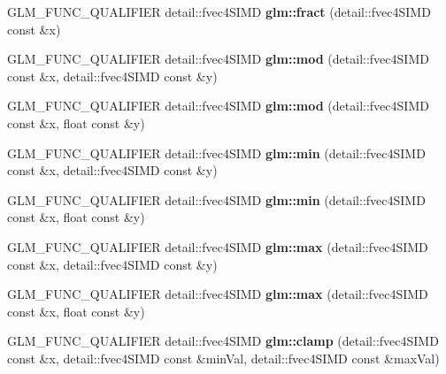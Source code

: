 \begin{DoxyCompactItemize}
\mbox{\label{simd__vec4_8inl_a5a003d7f27903c03744ca6271f1a9051}} 
G\+L\+M\+\_\+\+F\+U\+N\+C\+\_\+\+Q\+U\+A\+L\+I\+F\+I\+ER detail\+::fvec4\+S\+I\+MD {\bfseries glm\+::fract} (detail\+::fvec4\+S\+I\+MD const \&x)
\item 
\mbox{\label{simd__vec4_8inl_a560289b95e600d6da427ad473c1f46cf}} 
G\+L\+M\+\_\+\+F\+U\+N\+C\+\_\+\+Q\+U\+A\+L\+I\+F\+I\+ER detail\+::fvec4\+S\+I\+MD {\bfseries glm\+::mod} (detail\+::fvec4\+S\+I\+MD const \&x, detail\+::fvec4\+S\+I\+MD const \&y)
\item 
\mbox{\label{simd__vec4_8inl_a66a9b0ed141fd219673b9adf8e400ec0}} 
G\+L\+M\+\_\+\+F\+U\+N\+C\+\_\+\+Q\+U\+A\+L\+I\+F\+I\+ER detail\+::fvec4\+S\+I\+MD {\bfseries glm\+::mod} (detail\+::fvec4\+S\+I\+MD const \&x, float const \&y)
\item 
\mbox{\label{simd__vec4_8inl_af6ef9739a4145dc0004408132eff235b}} 
G\+L\+M\+\_\+\+F\+U\+N\+C\+\_\+\+Q\+U\+A\+L\+I\+F\+I\+ER detail\+::fvec4\+S\+I\+MD {\bfseries glm\+::min} (detail\+::fvec4\+S\+I\+MD const \&x, detail\+::fvec4\+S\+I\+MD const \&y)
\item 
\mbox{\label{simd__vec4_8inl_ace53be5aa101f55503d1fd863ac97de3}} 
G\+L\+M\+\_\+\+F\+U\+N\+C\+\_\+\+Q\+U\+A\+L\+I\+F\+I\+ER detail\+::fvec4\+S\+I\+MD {\bfseries glm\+::min} (detail\+::fvec4\+S\+I\+MD const \&x, float const \&y)
\item 
\mbox{\label{simd__vec4_8inl_a8003e838df57188edaa8b8fe512516a6}} 
G\+L\+M\+\_\+\+F\+U\+N\+C\+\_\+\+Q\+U\+A\+L\+I\+F\+I\+ER detail\+::fvec4\+S\+I\+MD {\bfseries glm\+::max} (detail\+::fvec4\+S\+I\+MD const \&x, detail\+::fvec4\+S\+I\+MD const \&y)
\item 
\mbox{\label{simd__vec4_8inl_a6a8611ddc96e204e7669872c6a68b972}} 
G\+L\+M\+\_\+\+F\+U\+N\+C\+\_\+\+Q\+U\+A\+L\+I\+F\+I\+ER detail\+::fvec4\+S\+I\+MD {\bfseries glm\+::max} (detail\+::fvec4\+S\+I\+MD const \&x, float const \&y)
\item 
\mbox{\label{simd__vec4_8inl_a5c4a12e002e5eb23b8a12639c7484378}} 
G\+L\+M\+\_\+\+F\+U\+N\+C\+\_\+\+Q\+U\+A\+L\+I\+F\+I\+ER detail\+::fvec4\+S\+I\+MD {\bfseries glm\+::clamp} (detail\+::fvec4\+S\+I\+MD const \&x, detail\+::fvec4\+S\+I\+MD const \&min\+Val, detail\+::fvec4\+S\+I\+MD const \&max\+Val)

\end{DoxyCompactItemize}
